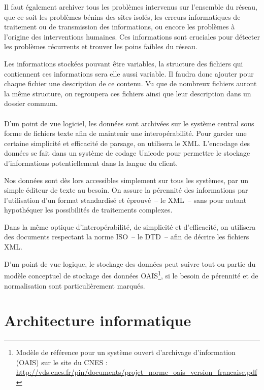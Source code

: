 \documentclass[a4paper, 11pt, final]{article}
\begin{document}
Il faut également archiver tous les problèmes intervenus sur
l'ensemble du réseau, que ce soit les problèmes bénins des sites
isolés, les erreurs informatiques de traitement ou de transmission
des informations, ou encore les problèmes à l'origine des
interventions humaines. Ces informations sont cruciales pour détecter
les problèmes récurrents et trouver les poins faibles du réseau.

Les informations stockées pouvant être variables, la structure des fichiers
qui contiennent ces informations sera elle aussi variable. Il faudra donc ajouter
pour chaque fichier une description de ce contenu. Vu que de nombreux fichiers
auront la même structure, on regroupera ces fichiers ainsi que leur description
dans un dossier commum.

\paragraph{}
D'un point de vue logiciel, les données sont archivées sur le système
central sous forme de fichiers texte afin de maintenir une
interopérabilité. Pour garder une certaine simplicité et efficacité de
parsage, on utilisera le XML. L'encodage des données se fait dans un
système de codage Unicode pour permettre le stockage d'informations
potentiellement dans la langue du client.

Nos données sont dès lors accessibles simplement sur tous les
systèmes, par un simple éditeur de texte au besoin. On assure la
pérennité des informations par l'utilisation d'un format standardisé
et éprouvé~-- le XML~-- sans pour autant hypothéquer les possibilités
de traitements complexes.

Dans la même optique d'interopérabilité, de simplicité et d'efficacité,
on utilisera des documents respectant la norme ISO~-- le DTD~-- afin de
décrire les fichiers XML.

D'un point de vue logique, le stockage des données peut suivre tout
ou partie du modèle conceptuel de stockage des données
OAIS\footnote{Modèle de référence pour un système ouvert d'archivage
d'information (OAIS) sur le site du CNES :
\url{http://vds.cnes.fr/pin/documents/projet_norme_oais_version_francaise.pdf}},
si le besoin de pérennité et de normalisation sont particulièrement
marqués.

\section{Architecture informatique}
\end{document}
